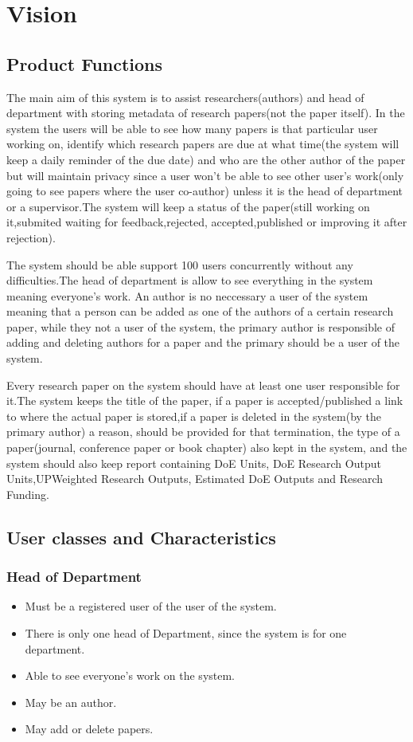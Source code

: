\documentclass[a4paper,12pt]{report}
\begin{document}
\chapter{Vision}
\section{Product Functions}

The main aim of this system is to assist researchers(authors) and head of department with storing metadata of research papers(not the paper itself). In the system the users will be able to see how many papers is that particular user working on,  identify which research papers  are due at what time(the system will keep a daily reminder of the due date) and who are the other author of the paper but will maintain privacy since a user won't be able to see other user's work(only going to see papers where the user co-author) unless it is the head of department or a supervisor.The system will keep a status of the paper(still working on it,submited waiting for feedback,rejected, accepted,published or improving it after rejection).

The system should be able support 100 users concurrently without any difficulties.The head of department is allow to see everything in the system meaning everyone's work. An author is no neccessary a user of the system meaning that a person can be added as one of the authors of a certain research paper, while they not a user of the system, the primary author is responsible of adding and deleting authors for a paper and the primary should be a user of the system.

Every research paper on the system should have at least one user responsible for it.The system keeps the title of the paper, if a paper is accepted/published a link to where the actual paper is stored,if a paper is deleted in the system(by the primary author) a reason, should be provided for that termination, the type of a paper(journal, conference paper or book chapter) also kept in the system, and the system should also keep report containing DoE Units, DoE Research Output Units,UPWeighted Research Outputs, Estimated DoE Outputs and Research Funding.

\section{User classes and Characteristics}
\subsection{Head of Department}
\begin{itemize}
\item
Must be a registered user of the user of the system.
\item
There is only one head of Department, since the system is for one department.
\item
 Able to see everyone's work on the system.
\item
May be an author.
\item
May add or delete papers.

\end{itemize}
\end{document}
